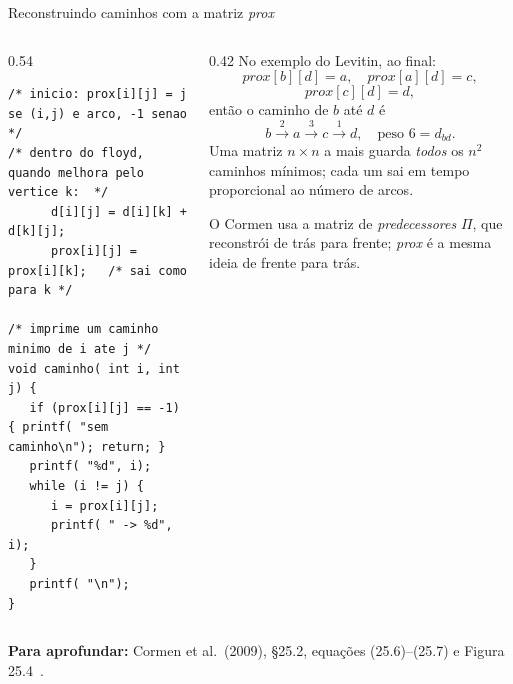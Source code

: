 \documentclass[aspectratio=169,xcolor=table]{beamer}
\newcommand{\fonte}[1]{%
  \vfill
  {\tiny\color{gray!55!black}\textbf{Para aprofundar:} #1\par}%
}
\begin{document}
\begin{frame}[fragile]{Reconstruindo caminhos com a matriz \textit{prox}}
  \begin{columns}[T]
    \begin{column}{0.54\textwidth}
\begin{lstlisting}[basicstyle=\ttfamily\tiny]
/* inicio: prox[i][j] = j se (i,j) e arco, -1 senao */
/* dentro do floyd, quando melhora pelo vertice k:  */
      d[i][j] = d[i][k] + d[k][j];
      prox[i][j] = prox[i][k];   /* sai como para k */

/* imprime um caminho minimo de i ate j */
void caminho( int i, int j) {
   if (prox[i][j] == -1) { printf( "sem caminho\n"); return; }
   printf( "%d", i);
   while (i != j) {
      i = prox[i][j];
      printf( " -> %d", i);
   }
   printf( "\n");
}
\end{lstlisting}
    \end{column}
    \begin{column}{0.42\textwidth}
      \scriptsize No exemplo do Levitin, ao final:
      \[
        \mathit{prox}[b][d] = a,\quad \mathit{prox}[a][d] = c,
      \]
      \[ \mathit{prox}[c][d] = d, \]
      então o caminho de $b$ até $d$ é
      \[ b \xrightarrow{2} a \xrightarrow{3} c \xrightarrow{1} d,\quad\text{peso } 6 = d_{bd}. \]
      Uma matriz $n\times n$ a mais guarda \emph{todos} os $n^2$ caminhos mínimos; cada um sai
      em tempo proporcional ao número de arcos.
      \medskip

      O Cormen usa a matriz de \emph{predecessores} $\Pi$, que reconstrói de trás para
      frente; \textit{prox} é a mesma ideia de frente para trás.
    \end{column}
  \end{columns}
  \fonte{Cormen et al.\ (2009), \S 25.2, equações (25.6)--(25.7) e Figura
    25.4~\cite{cormen2009introduction}.}
\end{frame}
\end{document}
